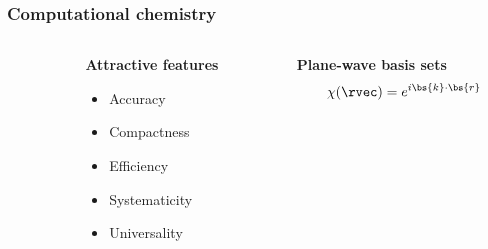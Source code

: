 \begin{frame}
    \frametitle{Computational chemistry}
    \begin{columns}
    \begin{column}{.10\textwidth}
    \end{column}
    \begin{column}{.30\textwidth}
    \textbf{Attractive features}
    \begin{itemize}
        \item {\color{yellow} Accuracy}
        \item {\color{yellow} Compactness}
        \item {\color{yellow} Efficiency}
        \item {\color{green} Systematicity}
        \item {\color{yellow} Universality}
    \end{itemize}
    \end{column}
    \begin{column}{.60\textwidth}
    \centering
    \textbf{Plane-wave basis sets}
    \begin{equation}
        \nonumber
        \chi(\rvec) = e^{i\bs{k}\cdot\bs{r}}
    \end{equation}
    
    \end{column}
    \end{columns}    

    \vspace{5mm}


\end{frame}

